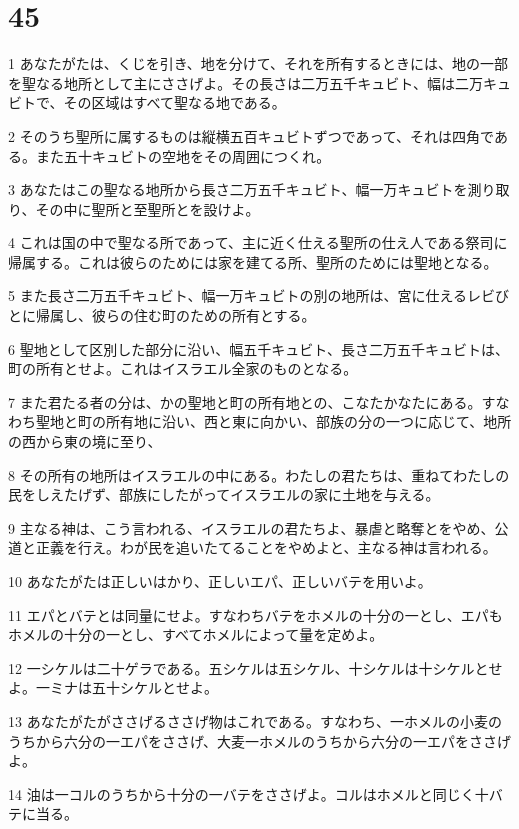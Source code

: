 \chapter{45}

\par 1 あなたがたは、くじを引き、地を分けて、それを所有するときには、地の一部を聖なる地所として主にささげよ。その長さは二万五千キュビト、幅は二万キュビトで、その区域はすべて聖なる地である。
\par 2 そのうち聖所に属するものは縦横五百キュビトずつであって、それは四角である。また五十キュビトの空地をその周囲につくれ。
\par 3 あなたはこの聖なる地所から長さ二万五千キュビト、幅一万キュビトを測り取り、その中に聖所と至聖所とを設けよ。
\par 4 これは国の中で聖なる所であって、主に近く仕える聖所の仕え人である祭司に帰属する。これは彼らのためには家を建てる所、聖所のためには聖地となる。
\par 5 また長さ二万五千キュビト、幅一万キュビトの別の地所は、宮に仕えるレビびとに帰属し、彼らの住む町のための所有とする。
\par 6 聖地として区別した部分に沿い、幅五千キュビト、長さ二万五千キュビトは、町の所有とせよ。これはイスラエル全家のものとなる。
\par 7 また君たる者の分は、かの聖地と町の所有地との、こなたかなたにある。すなわち聖地と町の所有地に沿い、西と東に向かい、部族の分の一つに応じて、地所の西から東の境に至り、
\par 8 その所有の地所はイスラエルの中にある。わたしの君たちは、重ねてわたしの民をしえたげず、部族にしたがってイスラエルの家に土地を与える。
\par 9 主なる神は、こう言われる、イスラエルの君たちよ、暴虐と略奪とをやめ、公道と正義を行え。わが民を追いたてることをやめよと、主なる神は言われる。
\par 10 あなたがたは正しいはかり、正しいエパ、正しいバテを用いよ。
\par 11 エパとバテとは同量にせよ。すなわちバテをホメルの十分の一とし、エパもホメルの十分の一とし、すべてホメルによって量を定めよ。
\par 12 一シケルは二十ゲラである。五シケルは五シケル、十シケルは十シケルとせよ。一ミナは五十シケルとせよ。
\par 13 あなたがたがささげるささげ物はこれである。すなわち、一ホメルの小麦のうちから六分の一エパをささげ、大麦一ホメルのうちから六分の一エパをささげよ。
\par 14 油は一コルのうちから十分の一バテをささげよ。コルはホメルと同じく十バテに当る。
